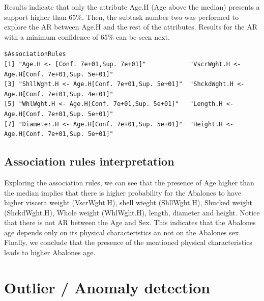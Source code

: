 \documentclass[10pt, paper=a4]{article}
\begin{document}
Results indicate that only the attribute Age.H (Age above the median) presents a support higher than 65\%. Then, the subtask number two was performed to explore the AR between Age.H and the rest of the attributes. Results for the AR with a minimum confidence of 65\% can be seen next.
\begin{verbatim}
$AssociationRules
[1] "Age.H <- [Conf. 7e+01,Sup. 7e+01]"            "VscrWght.H <- Age.H[Conf. 7e+01,Sup. 5e+01]" 
[3] "ShllWght.H <- Age.H[Conf. 7e+01,Sup. 5e+01]"  "ShckdWght.H <- Age.H[Conf. 7e+01,Sup. 4e+01]"
[5] "WhlWght.H <- Age.H[Conf. 7e+01,Sup. 5e+01]"   "Length.H <- Age.H[Conf. 7e+01,Sup. 5e+01]"   
[7] "Diameter.H <- Age.H[Conf. 7e+01,Sup. 5e+01]"  "Height.H <- Age.H[Conf. 7e+01,Sup. 5e+01]"
\end{verbatim}

\subsection{Association rules interpretation}
Exploring the association rules, we can see that the presence of Age higher than the median implies that there is higher probability for the Abalones to have higher viscera weight (VscrWght.H), shell wieght (ShllWght.H), Shucked weight (ShckdWght.H), Whole weight (WhlWght.H), length, diameter and height. Notice that there is not AR between the Age and Sex. This indicates that the Abalones age depends only on its physical characteristics an not on the Abalones sex. Finally, we conclude that the presence of the mentioned physical characteristics leads to higher Abalones age.


\section{Outlier / Anomaly detection}
\label{sec:detection}

\end{document}
